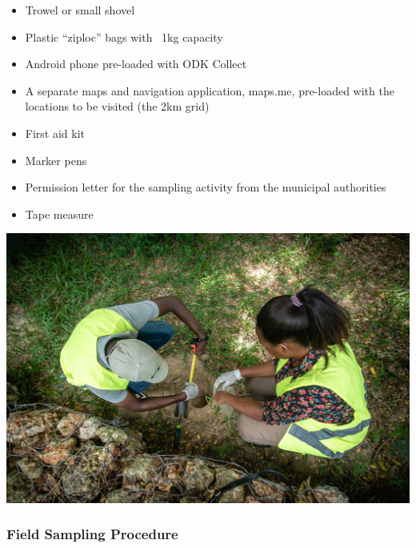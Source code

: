\documentclass[a4paper,12pt,twoside]{article}
\begin{document}
\begin{itemize}
  \item Trowel or small shovel
  \item Plastic ``ziploc'' bags with ~1kg capacity
  \item Android phone pre-loaded with ODK Collect
  \item A separate maps and navigation application, maps.me, pre-loaded with the locations to be visited (the 2km grid)
  \item First aid kit
  \item Marker pens
  \item Permission letter for the sampling activity from the municipal authorities
  \item Tape measure
\end{itemize}

\includegraphics[width=\textwidth]{DSC05587.jpg}  

\color{RHblue}
\subsubsection{Field Sampling Procedure}
\end{document}
